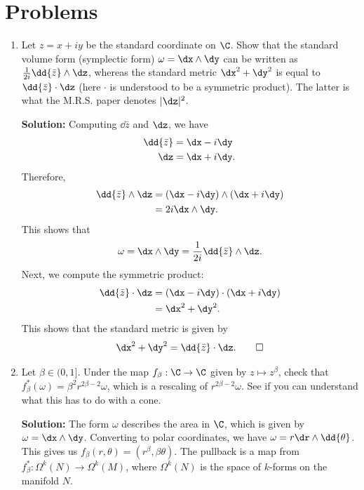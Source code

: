 \documentclass[notitlepage]{report}
\begin{document}
  \section*{Problems}

  \begin{enumerate}
    \item Let $z = x + iy$ be the standard coordinate on $\C$. Show that the standard volume form (symplectic form) $\omega = \dx \wedge \dy$ can be written as $\frac{1}{2i} \dd{\bar{z}} \wedge \dz$, whereas the standard metric $\dx^2 + \dy^2$ is equal to $\dd{\bar{z}} \cdot \dz$ (here $\cdot$ is understood to be a symmetric product). The latter is what the M.R.S. paper denotes $|\dz|^2$.

      \textbf{Solution:} Computing $\dd{\bar{z}}$ and $\dz$, we have
      \begin{align*}
        \dd{\bar{z}} &= \dx - i\dy \\
        \dz &= \dx + i\dy
      .\end{align*}
      Therefore,
      \begin{align*}
        \dd{\bar{z}} \wedge \dz &= (\dx - i\dy) \wedge (\dx + i\dy) \\
                              &= 2i \dx \wedge \dy
      .\end{align*}
      This shows that
      \[%
        \omega = \dx \wedge \dy = \frac{1}{2i} \dd{\bar{z}} \wedge \dz
      .\]%
      Next, we compute the symmetric product:
      \begin{align*}
        \dd{\bar{z}} \cdot \dz &= (\dx - i\dy) \cdot (\dx + i\dy) \\
                             &= \dx^2 + \dy^2
      .\end{align*}
      This shows that the standard metric is given by
      \[%
        \dx^2 + \dy^2 = \dd{\bar{z}} \cdot \dz
      .\tag*{$\square$}\]%

    \item Let $\beta \in (0, 1]$. Under the map $f_\beta : \C \to \C$ given by $z \mapsto z^\beta$, check that $f_\beta^*(\omega) = \beta^2 r^{2\beta-2}\omega$, which is a rescaling of $r^{2\beta-2}\omega$. See if you can understand what this has to do with a cone.

      \textbf{Solution:} The form $\omega$ describes the area in $\C$, which is given by $\omega = \dx \wedge \dy$. Converting to polar coordinates, we have $\omega = r \dr \wedge \dd{\theta}$. This gives us $f_\beta(r, \theta) = (r^\beta, \beta\theta)$. The pullback is a map from $f_\beta^* : \Omega^k(N) \to \Omega^k(M)$, where $\Omega^k(N)$ is the space of $k$-forms on the manifold $N$.


\end{enumerate}
\end{document}
